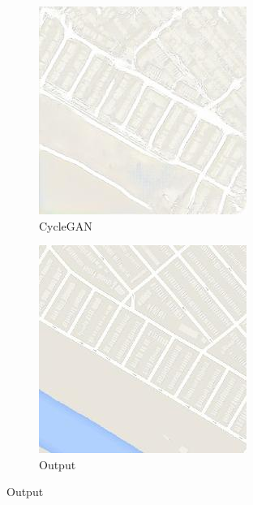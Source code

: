 \begin{figure}
\begin{subfigure}[t]{.2\textwidth}
	\end{subfigure}
	\begin{subfigure}[t]{.2\textwidth}
	  \caption*{CycleGAN}
	  \centering
	  \includegraphics[width=\linewidth]{images/cycleGanResults/Maps6Ld120_E100_Lr0002.jpg}
	\end{subfigure}
	\begin{subfigure}[t]{.2\textwidth}
	  \caption*{Output}
	  \centering
	  \includegraphics[width=\linewidth]{images/cycleGanResults/Maps6_Or_Ld120_E100_Lr0002.jpg}
	\end{subfigure}
  

\end{figure}
